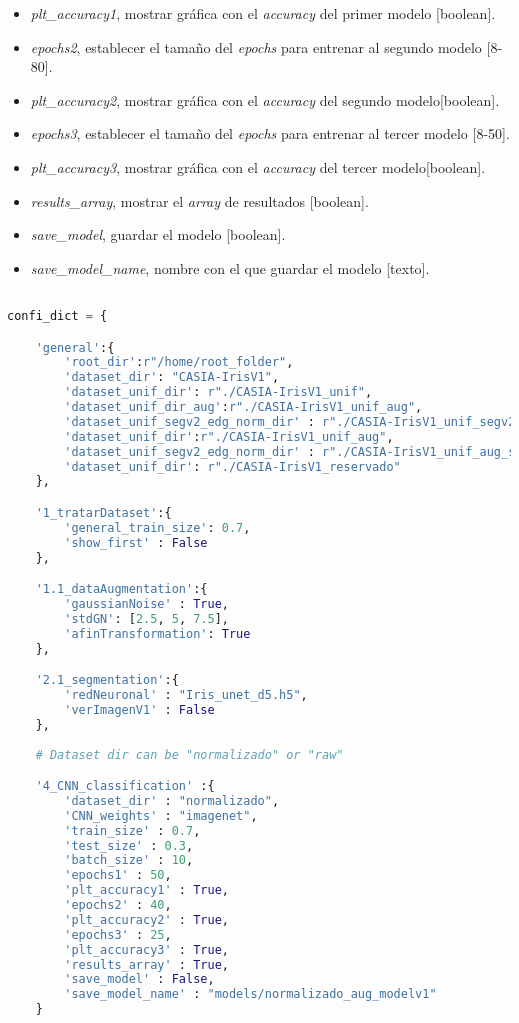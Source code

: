{\begin{itemize}
\begin{itemize}
        \item \textit{plt\_accuracy1}, mostrar gráfica con el \textit{accuracy} del primer modelo [boolean].
        \item \textit{epochs2}, establecer el tamaño del \textit{epochs} para entrenar al segundo modelo [8-80].
        \item \textit{plt\_accuracy2}, mostrar gráfica con el \textit{accuracy} del segundo modelo[boolean].
        \item \textit{epochs3}, establecer el tamaño del \textit{epochs} para entrenar al tercer modelo [8-50].
        \item \textit{plt\_accuracy3}, mostrar gráfica con el \textit{accuracy} del tercer modelo[boolean].
        \item \textit{results\_array}, mostrar el \textit{array} de resultados [boolean].
        \item \textit{save\_model}, guardar el modelo [boolean].
        \item \textit{save\_model\_name}, nombre con el que guardar el modelo [texto].
    \end{itemize}
\end{itemize}


\begin{lstlisting}[language=Python] 

confi_dict = {

    'general':{
        'root_dir':r"/home/root_folder",
        'dataset_dir': "CASIA-IrisV1",
        'dataset_unif_dir': r"./CASIA-IrisV1_unif",
        'dataset_unif_dir_aug':r"./CASIA-IrisV1_unif_aug",
        'dataset_unif_segv2_edg_norm_dir' : r"./CASIA-IrisV1_unif_segv2_edg_norm",
        'dataset_unif_dir':r"./CASIA-IrisV1_unif_aug",
        'dataset_unif_segv2_edg_norm_dir' : r"./CASIA-IrisV1_unif_aug_segv2_edg_norm",
        'dataset_unif_dir': r"./CASIA-IrisV1_reservado"
    },

    '1_tratarDataset':{
        'general_train_size': 0.7,
        'show_first' : False
    },

    '1.1_dataAugmentation':{
        'gaussianNoise' : True,
        'stdGN': [2.5, 5, 7.5],
        'afinTransformation': True
    },

    '2.1_segmentation':{
        'redNeuronal' : "Iris_unet_d5.h5", 
        'verImagenV1' : False
    },
    
    # Dataset dir can be "normalizado" or "raw"

    '4_CNN_classification' :{
        'dataset_dir' : "normalizado",
        'CNN_weights' : "imagenet",
        'train_size' : 0.7, 
        'test_size' : 0.3, 
        'batch_size' : 10,
        'epochs1' : 50, 
        'plt_accuracy1' : True,
        'epochs2' : 40, 
        'plt_accuracy2' : True,
        'epochs3' : 25, 
        'plt_accuracy3' : True,
        'results_array' : True,
        'save_model' : False, 
        'save_model_name' : "models/normalizado_aug_modelv1"
    }


\end{lstlisting}}
